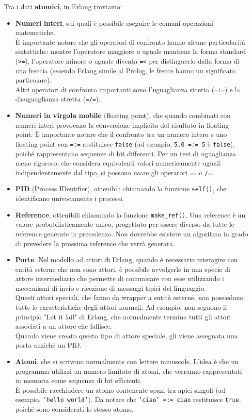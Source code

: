 \documentclass{article}
\begin{document}
Tra i dati \textbf{atomici}, in Erlang troviamo:
\begin{itemize}
    \item \textbf{Numeri interi}, sui quali è possibile eseguire le comuni operazioni matematiche.\\
    È importante notare che gli operatori di confronto hanno alcune particolarità sintattiche: mentre l'operatore maggiore o uguale mantiene la forma standard (\texttt{>=}), l'operatore minore o uguale diventa \texttt{=<} per distinguerlo dalla forma di una freccia (essendo Erlang simile al Prolog, le frecce hanno un significato particolare).\\
    Altri operatori di confronto importanti sono l'uguaglianza stretta (\texttt{=:=}) e la disuguaglianza stretta (\texttt{=/=}).
    \item \textbf{Numeri in virgola mobile} (floating point), che quando combinati con numeri interi provocano la conversione implicita del risultato in floating point. È importante notare che il confronto tra un numero intero e uno floating point con \texttt{=:=} restituisce \texttt{false} (ad esempio, \texttt{5.0 =:= 5} è \texttt{false}), poiché rappresentano sequenze di bit differenti. Per un test di uguaglianza meno rigoroso, che considera equivalenti valori numericamente uguali indipendentemente dal tipo, si possono usare gli operatori \texttt{==} o \texttt{/=}.
    \item \textbf{PID} (Process IDentifier), ottenibili chiamando la funzione \texttt{self()}, che identificano univocamente i processi.
    \item \textbf{Reference}, ottenibili chiamando la funzione \texttt{make\_ref()}. Una reference è un valore probabilisticamente unico, progettato per essere diverso da tutte le reference generate in precedenza. Non dovrebbe esistere un algoritmo in grado di prevedere la prossima reference che verrà generata.
    \item \textbf{Porte}. Nel modello ad attori di Erlang, quando è necessario interagire con entità esterne che non sono attori, è possibile avvolgerle in una specie di attore intermediario che permette di comunicare con esse utilizzando i meccanismi di invio e ricezione di messaggi tipici del linguaggio.\\
    Questi attori speciali, che fanno da wrapper a entità esterne, non possiedono tutte le caratteristiche degli attori normali. Ad esempio, non seguono il principio "Let it fail" di Erlang, che normalmente termina tutti gli attori associati a un attore che fallisce.\\
    Quando viene creato questo tipo di attore speciale, gli viene assegnata una porta anziché un PID.
    \item \textbf{Atomi}, che si scrivono normalmente con lettere minuscole. L'idea è che un programma utilizzi un numero limitato di atomi, che verranno rappresentati in memoria come sequenze di bit efficienti.\\
    È possibile racchiudere un atomo contenente spazi tra apici singoli (ad esempio, \texttt{'hello world'}). Da notare che \texttt{'ciao' =:= ciao} restituisce \texttt{true}, poiché sono considerati lo stesso atomo.
\end{itemize}
\end{document}
